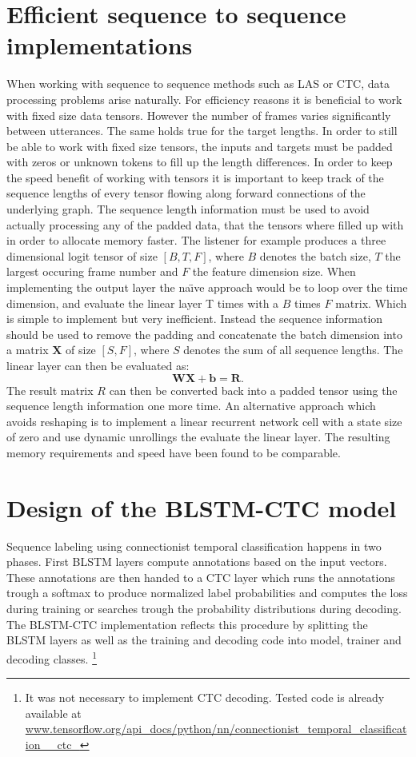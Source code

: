\section{Efficient sequence to sequence implementations}
When working with sequence to sequence methods such as LAS or CTC, data processing problems arise naturally. For efficiency reasons it is beneficial to work with fixed size data tensors. However the number of frames varies significantly between utterances. The same holds true for the target lengths. In order to still be able to work with fixed size tensors, the inputs and targets must be padded with zeros or unknown tokens to fill up the length differences.
In order to keep the speed benefit of working with tensors it is important to
keep track of the sequence lengths of every tensor flowing along forward connections of the underlying graph.
The sequence length information must be used to avoid actually processing any of the padded data, that the tensors where filled up with in order to allocate memory faster.
The listener for example produces a three dimensional logit tensor of size $[B, T, F]$, where $B$ denotes the batch size, $T$ the largest occuring frame number and $F$ the feature dimension size. When implementing the output layer the na\"{\i}ve approach would be to loop over the time dimension, and evaluate the linear layer T times with a $B$ times $F$ matrix. Which is simple to implement but very inefficient. Instead the sequence information should be used to remove the padding and concatenate the batch dimension into a matrix $\mathbf{X}$ of size $[S, F]$, where $S$ denotes the sum of all sequence lengths. The linear layer can then be evaluated as:
\begin{equation}
\mathbf{W}\mathbf{X} + \mathbf{b} = \mathbf{R}.
\end{equation}
The result matrix $R$ can then be converted back into a padded tensor using the sequence length information one more time.
An alternative approach which avoids reshaping is to implement a linear recurrent network cell with a state size of zero and use dynamic unrollings the evaluate the linear layer. The resulting memory requirements and speed have been found to be comparable.

\section{Design of the BLSTM-CTC model}
Sequence labeling using connectionist temporal classification happens in two phases. First BLSTM layers compute annotations based on the input vectors. These annotations are then handed to a CTC layer which runs the annotations trough a softmax to produce normalized label probabilities and computes the loss during training or searches trough the probability distributions during decoding. 
The BLSTM-CTC implementation reflects this procedure by splitting the BLSTM layers as well as the training and decoding code into model, trainer and decoding classes. \footnote{It was not necessary to implement CTC decoding. Tested code is already available at \url{www.tensorflow.org/api_docs/python/nn/connectionist\_temporal\_classification\_\_ctc\_}} 



